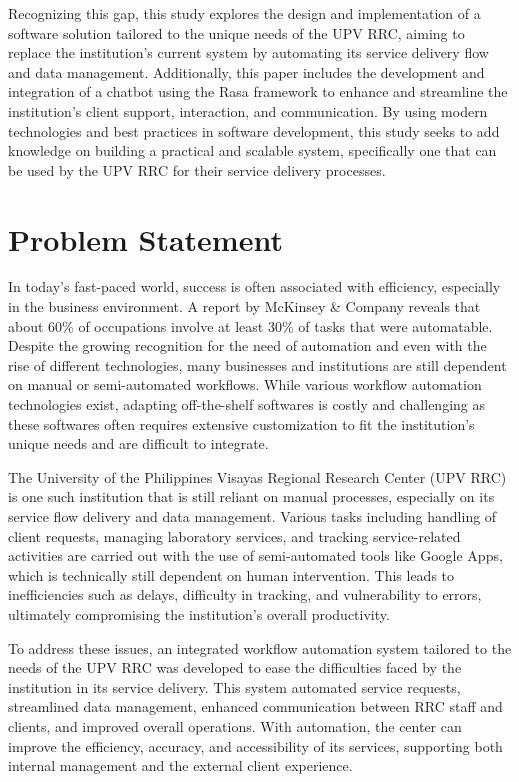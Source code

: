 Recognizing this gap, this study explores the design and implementation of a software solution tailored to the unique needs of the UPV RRC, aiming to replace the institution’s current system by automating its service delivery flow and data management. Additionally, this paper includes the development and integration of a chatbot using the Rasa framework to enhance and streamline the institution’s client support, interaction, and communication. By using modern technologies and best practices in software development, this study seeks to add knowledge on building a practical and scalable system, specifically one that can be used by the UPV RRC for their service delivery processes.

\section{Problem Statement}

In today’s fast-paced world, success is often associated with efficiency, especially in the business environment. A report by McKinsey \& Company \cite{manyika2017} reveals that about 60\% of occupations involve at least 30\% of tasks that were automatable. Despite the growing recognition for the need of automation and even with the rise of different technologies, many businesses and institutions are still dependent on manual or semi-automated workflows. While various workflow automation technologies exist, adapting off-the-shelf softwares is costly and challenging as these softwares often requires extensive customization to fit the institution’s unique needs and are difficult to integrate. 

The University of the Philippines Visayas Regional Research Center (UPV RRC) is one such institution that is still reliant on manual processes, especially on its service flow delivery and data management. Various tasks including handling of client requests, managing laboratory services, and tracking service-related activities are carried out with the use of semi-automated tools like Google Apps, which is technically still dependent on human intervention. This leads to inefficiencies such as delays, difficulty in tracking, and vulnerability to errors, ultimately compromising the institution’s overall productivity.

To address these issues, an integrated workflow automation system tailored to the needs of the UPV RRC was developed to ease the difficulties faced by the institution in its service delivery. This system automated service requests, streamlined data management, enhanced communication between RRC staff and clients, and improved overall operations. With automation, the center can improve the efficiency, accuracy, and accessibility of its services, supporting both internal management and the external client experience.

